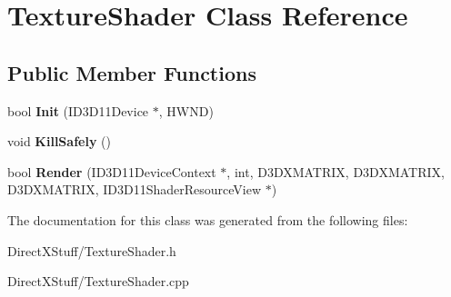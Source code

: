 \hypertarget{class_texture_shader}{\section{Texture\-Shader Class Reference}
\label{class_texture_shader}
}
\subsection*{Public Member Functions}
\begin{DoxyCompactItemize}
\item 
\hypertarget{class_texture_shader_aad3ea3a4efd4e658d024bf20c333f67b}{bool {\bfseries Init} (I\-D3\-D11\-Device $\ast$, H\-W\-N\-D)}\label{class_texture_shader_aad3ea3a4efd4e658d024bf20c333f67b}

\item 
\hypertarget{class_texture_shader_aed95ac728832ec0e4811d18ceebe8e9d}{void {\bfseries Kill\-Safely} ()}\label{class_texture_shader_aed95ac728832ec0e4811d18ceebe8e9d}

\item 
\hypertarget{class_texture_shader_a61d510eebf520f4a749266b5564f020a}{bool {\bfseries Render} (I\-D3\-D11\-Device\-Context $\ast$, int, D3\-D\-X\-M\-A\-T\-R\-I\-X, D3\-D\-X\-M\-A\-T\-R\-I\-X, D3\-D\-X\-M\-A\-T\-R\-I\-X, I\-D3\-D11\-Shader\-Resource\-View $\ast$)}\label{class_texture_shader_a61d510eebf520f4a749266b5564f020a}

\end{DoxyCompactItemize}


The documentation for this class was generated from the following files\-:\begin{DoxyCompactItemize}
\item 
Direct\-X\-Stuff/Texture\-Shader.\-h\item 
Direct\-X\-Stuff/Texture\-Shader.\-cpp\end{DoxyCompactItemize}
